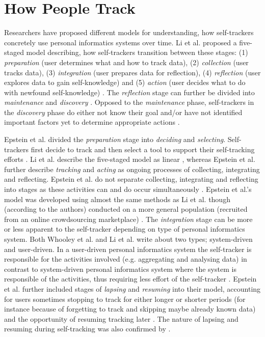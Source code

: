 \section{How People Track}
Researchers have proposed different models for understanding, how self-trackers concretely use personal informatics systems over time. Li et al. proposed a five-staged model describing, how self-trackers transition between these stages: (1) \textit{preparation} (user determines what and how to track data), (2) \textit{collection} (user tracks data), (3) \textit{integration} (user prepares data for reflection), (4) \textit{reflection} (user explores data to gain self-knowledge) and (5) \textit{action} (user decides what to do with newfound self-knowledge) \citep{Li2010}. The \textit{reflection} stage can further be divided into \textit{maintenance} and \textit{discovery} \citep{Li2011}. Opposed to the \textit{maintenance} phase, self-trackers in the \textit{discovery} phase do either not know their goal and/or have not identified important factors yet to determine appropriate actions \citep{Li2011}. 

Epstein et al. divided the \textit{preparation} stage into \textit{deciding} and \textit{selecting}. Self-trackers first decide to track and then select a tool to support their self-tracking efforts \citep{Epstein2015}. Li et al. describe the five-staged model as linear \citep{Li2010}, whereas Epstein et al. further describe \textit{tracking} and \textit{acting} as ongoing processes of collecting, integrating and reflecting. Epstein et al. do not separate collecting, integrating and reflecting into stages as these activities can and do occur simultaneously \citep{Epstein2015, MacLeod2014}. Epstein et al.'s model was developed using almost the same methods as Li et al. though (according to the authors) conducted on a more general population (recruited from an online crowdsourcing marketplace) \citep{Epstein2015}. The \textit{integration} stage can be more or less apparent to the self-tracker depending on type of personal informatics system. Both Whooley et al. and Li et al. write about two types; system-driven and user-driven. In a user-driven personal informatics system the self-tracker is responsible for the activities involved (e.g. aggregating and analysing data) in contrast to system-driven personal informatics system where the system is responsible of the activities, thus requiring less effort of the self-tracker \citep{Whooley2014,Li2010}. Epstein et al. further included stages of \textit{lapsing} and \textit{resuming} into their model, accounting for users sometimes stopping to track for either longer or shorter periods (for instance because of forgetting to track and skipping maybe already known data) and the opportunity of resuming tracking later \citep{Epstein2015}. The nature of lapsing and resuming during self-tracking was also confirmed by \citep{Rooksby2014}. 

